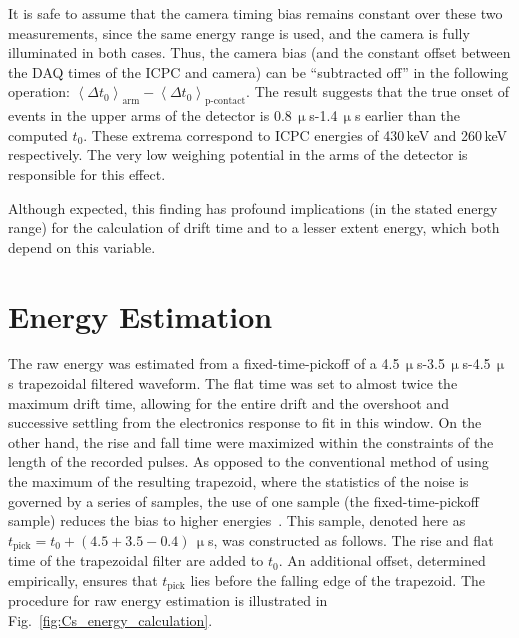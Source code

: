 It is safe to assume that the camera timing bias remains constant over these two measurements, since the same energy range is used, and the camera is fully illuminated in both cases. Thus, the camera bias (and the constant offset between the DAQ times of the ICPC and camera) can be ``subtracted off'' in the following operation: $\left< \Delta t_0 \right>_\text{arm} - \left< \Delta t_0 \right>_\text{p-contact}$. The result suggests that the true onset of events in the upper arms of the detector is 0.8\,$\upmu$s-1.4\,$\upmu$s earlier than the computed $t_0$. These extrema correspond to ICPC energies of 430\,keV and 260\,keV respectively. The very low weighing potential in the arms of the detector is responsible for this effect.

Although expected, this finding has profound implications (in the stated energy range) for the calculation of drift time and to a lesser extent energy, which both depend on this variable. 

\section{Energy Estimation}\label{sec:energy}

The raw energy was estimated from a fixed-time-pickoff of a 4.5\,$\upmu$s-3.5\,$\upmu$s-4.5\,$\upmu$s trapezoidal filtered waveform. The flat time was set to almost twice the maximum drift time, allowing for the entire drift and the overshoot and successive settling from the electronics response to fit in this window. On the other hand, the rise and fall time were maximized within the constraints of the length of the recorded pulses. As opposed to the conventional method of using the maximum of the resulting trapezoid, where the statistics of the noise is governed by a series of samples, the use of one sample (the fixed-time-pickoff sample) reduces the bias to higher energies~\cite{mjd_charge_trapping}. This sample, denoted here as $t_\text{pick} = t_0 + (4.5+3.5-0.4)\,\upmu$s, was constructed as follows. The rise and flat time of the trapezoidal filter are added to $t_0$. An additional offset, determined empirically, ensures that $t_\text{pick}$ lies before the falling edge of the trapezoid. The procedure for raw energy estimation is illustrated in Fig.~\ref{fig:Cs_energy_calculation}.

